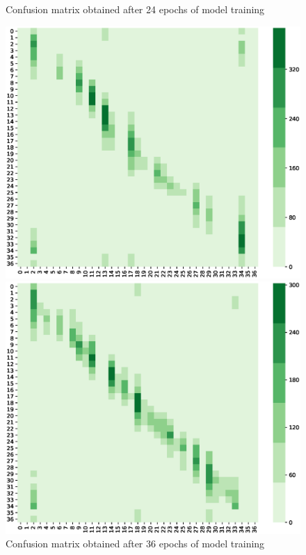 \begin{figure}
\begin{minipage}{0.49\textwidth}
        \caption[Confusion matrix obtained after 24 epochs of model training]
        {Confusion matrix obtained after 24 epochs of model training}
        \label{fig:cm-after-24-epochs}
    \end{minipage}

    \vspace*{1cm} %

    \begin{minipage}{0.49\textwidth}
        \includegraphics[width=\textwidth,height=\textheight,keepaspectratio]{Figures/confusion-matrix/ckpt-30757.eps}
        \caption[Confusion matrix obtained after 36 epochs of model training]
        {Confusion matrix obtained after 36 epochs of model training}
        \label{fig:cm-after-36-epochs}
    \end{minipage}
    \hspace{\fill} %
    \begin{minipage}{0.49\textwidth}
        \includegraphics[width=\textwidth,height=\textheight,keepaspectratio]{Figures/confusion-matrix/ckpt-40884.eps}

\end{minipage}
\end{figure}
